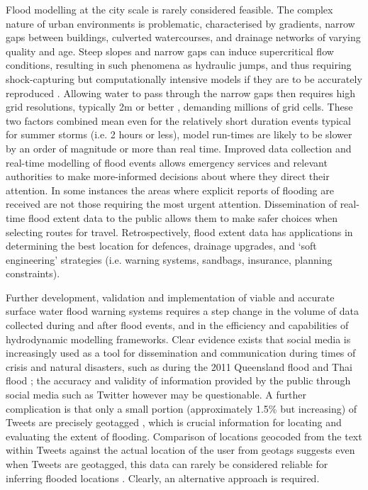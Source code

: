 Flood modelling at the city scale is rarely considered feasible. The complex nature of urban environments is problematic, characterised by gradients, narrow gaps between buildings, culverted watercourses, and drainage networks of varying quality and age. Steep slopes and narrow gaps can induce supercritical flow conditions, resulting in such phenomena as hydraulic jumps, and thus requiring shock-capturing but computationally intensive models if they are to be accurately reproduced \citep{Mignot2006}. Allowing water to pass through the narrow gaps then requires high grid resolutions, typically 2m or better \citep{Schubert2012}, demanding millions of grid cells. These two factors combined mean even for the relatively short duration events typical for summer storms (i.e. 2 hours or less), model run-times are likely to be slower by an order of magnitude or more than real time. 
Improved data collection and real-time modelling of flood events allows emergency services and relevant authorities to make more-informed decisions about where they direct their attention. In some instances the areas where explicit reports of flooding are received are not those requiring the most urgent attention. Dissemination of real-time flood extent data to the public allows them to make safer choices when selecting routes for travel. Retrospectively, flood extent data has applications in determining the best location for defences, drainage upgrades, and ‘soft engineering’ strategies (i.e. warning systems, sandbags, insurance, planning constraints). 

Further development, validation and implementation of viable and accurate surface water flood warning systems requires a step change in the volume of data collected during and after flood events, and in the efficiency and capabilities of hydrodynamic modelling frameworks. Clear evidence exists that social media is increasingly used as a tool for dissemination and communication during times of crisis and natural disasters, such as during the 2011 Queensland flood and Thai flood \citep{Starbird2010,Vieweg2010,Kongthon2012,Murthy2012}; the accuracy and validity of information provided by the public through social media such as Twitter however may be questionable. A further complication is that only a small portion (approximately 1.5\% but increasing) of Tweets are precisely geotagged \citep{Crampton2013}, which is crucial information for locating and evaluating the extent of flooding. Comparison of locations geocoded from the text within Tweets against the actual location of the user from geotags suggests even when Tweets are geotagged, this data can rarely be considered reliable for inferring flooded locations \citep{Leetaru2013}. Clearly, an alternative approach is required.

